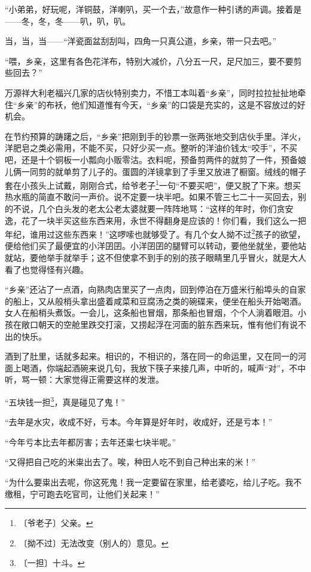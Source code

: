 \documentclass[12pt,UTF-8,openany]{ctexbook}
\begin{document}
\begin{large}
    “小弟弟，好玩呢，洋铜鼓，洋喇叭，买一个去，”故意作一种引诱的声调。接着是——冬，冬，冬——叭，叭，叭。
    
    当，当，当——“洋瓷面盆刮刮叫，四角一只真公道，乡亲，带一只去吧。”
    
    “喂，乡亲，这里有各色花洋布，特别大减价，八分五一尺，足尺加三，要不要剪些回去？”
    
    万源祥大利老福兴几家的店伙特别卖力，不惜工本叫着“乡亲”，同时拉拉扯扯地牵住“乡亲”的布袄，他们知道惟有今天，“乡亲”的口袋是充实的，这是不容放过的好机会。
    
    在节约预算的踌躇之后，“乡亲”把刚到手的钞票一张两张地交到店伙手里。洋火，洋肥皂之类必需用，不能不买，只好少买一点。整听的洋油价钱太“咬手”，不买吧，还是十个铜板一小瓢向小贩零沽。衣料呢，预备剪两件的就剪了一件，预备娘儿俩一同剪的就单剪了儿子的。蛋圆的洋镜拿到了手里又放进了橱窗。绒线的帽子套在小孩头上试戴，刚刚合式，给爷老子\footnote{〔爷老子〕父亲。}一句“不要买吧”，便又脱了下来。想买热水瓶的简直不敢问一声价。说不定要一块半吧。如果不管三七二十一买回去，别的不说，几个白头发的老太公老太婆就要一阵阵地骂：“这样的年时，你们贪安逸，花了一块半买这些东西来用，永世不得翻身是应该的！你们看，我们这么一把年纪，谁用过这些东西来！”这啰嗦也就够受了。有几个女人拗不过\footnote{〔拗不过〕无法改变（别人的）意见。}孩子的欲望，便给他们买了最便宜的小洋囝囝。小洋囝囝的腿臂可以转动，要他坐就坐，要他站就站，要他举手就举手；这不但使拿不到手的别的孩子眼睛里几乎冒火，就是大人看了也觉得怪有兴趣。
    
    “乡亲”还沾了一点酒，向熟肉店里买了一点肉，回到停泊在万盛米行船埠头的自家的船上，又从般梢头拿出盛着咸菜和豆腐汤之类的碗碟来，便坐在船头开始喝酒。女人在船梢头煮饭。一会儿，这条船也冒烟，那条船也冒烟，个个人淌着眼泪。小孩在敞口朝天的空舱里跌交打滚，又捞起浮在河面的脏东西来玩，惟有他们有说不出的快乐。
    
    酒到了肚里，话就多起来。相识的，不相识的，落在同一的命运里，又在同一的河面上喝酒，你端起酒碗来说几句，我放下筷子来接几声，中听的，喊声“对”，不中听，骂一顿：大家觉得正需要这样的发泄。
    
    “五块钱一担\footnote{〔一担〕十斗。}，真是碰见了鬼！”
    
    “去年是水灾，收成不好，亏本。今年算是好年时，收成好，还是亏本！”
    
    “今年亏本比去年都厉害；去年还粜七块半呢。”
    
    “又得把自己吃的米粜出去了。唉，种田人吃不到自己种出来的米！”
    
    “为什么要粜出去呢，你这死鬼！我一定要留在家里，给老婆吃，给儿子吃。我不缴租，宁可跑去吃官司，让他们关起来！”
    

\end{large}
\end{document}
